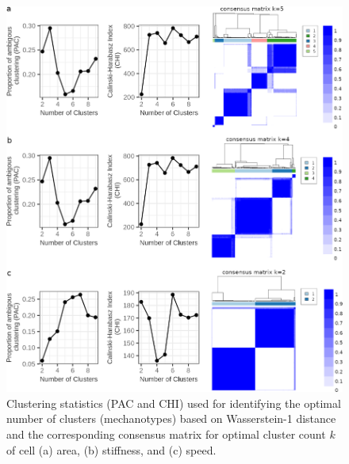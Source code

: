 \documentclass[11pt,letterpaper,english,oneside]{article} %
\begin{document}
\begin{figure}[H]
    \centering
    \includegraphics{../Figures/Supplementary_Figure11/supplementary_figure11.png}
    \caption{Clustering statistics (PAC and CHI) used for identifying the optimal number of clusters (mechanotypes) based on Wasserstein-1 distance and the corresponding consensus matrix for optimal cluster count $k$
    of cell (a) area, (b) stiffness, and (c) speed.}
    \label{fig:fig11}
\end{figure}
\end{document}
